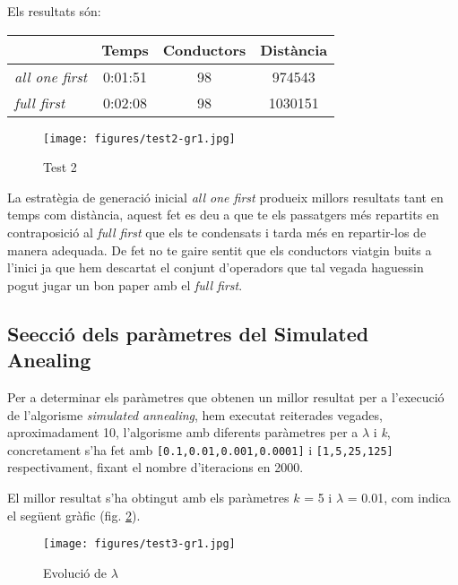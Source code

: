 Els resultats són:


\begin{center}
\begin{tabular}{l|ccc}
         & Temps & Conductors & Distància\\
\hline
\emph{all one first} & 0:01:51 & 98 & 974543  \\
\emph{full first} & 0:02:08 & 98 & 1030151 
\end{tabular}
\end{center}

\begin{figure}[H]
\begin{center}
 \texttt{[image: figures/test2-gr1.jpg]}
 \label{test2-gr1}
\caption{Test 2}
\end{center}
\end{figure}
                                                                                                                                                                                  
La estratègia de generació inicial \emph{all one first} produeix millors resultats tant en temps com distància,
aquest fet es deu a que te els passatgers més repartits en contraposició al \emph{full first} que els te
condensats i tarda més en repartir-los de manera adequada. De fet no te gaire sentit que els conductors
viatgin buits a l'inici ja que hem descartat el conjunt d'operadors que tal vegada haguessin pogut
jugar un bon paper amb el \emph{full first}.

\subsection{Se\lgem ecció dels paràmetres del Simulated Anealing}
Per a determinar els paràmetres que obtenen un millor resultat per a l'execució de l'algorisme \emph{simulated annealing},
hem executat reiterades vegades, aproximadament 10, l'algorisme amb diferents paràmetres per a $\lambda$ i \emph{k}, concretament s'ha fet amb
\texttt{[0.1,0.01,0.001,0.0001]} i \texttt{[1,5,25,125]} respectivament, fixant el nombre d'iteracions en 2000.

El millor resultat s'ha obtingut amb els paràmetres $k$ = 5 i $\lambda$ = 0.01, com indica el següent gràfic (fig. \ref{test3-gr1}).

\begin{figure}[H]
\begin{center} 
 \texttt{[image: figures/test3-gr1.jpg]}
\label{test3-gr1}
\caption{Evolució de $\lambda$}
\end{center}
\end{figure}

